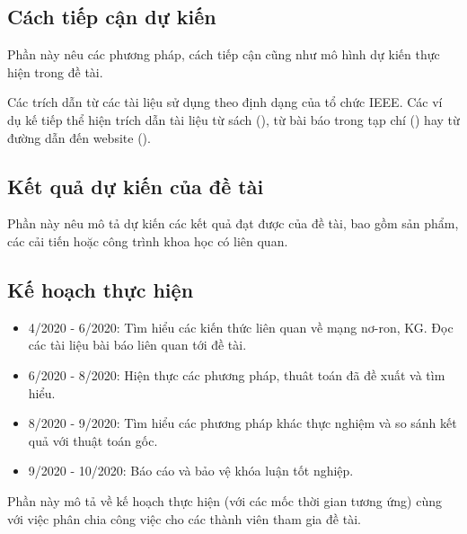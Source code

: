 \documentclass{article}[14pt]
\begin{document}
{    \subsection{Cách tiếp cận dự kiến}
    
    
    Phần này nêu các phương pháp, cách tiếp cận cũng như mô hình dự kiến thực hiện trong đề tài.
    
    Các trích dẫn từ các tài liệu sử dụng theo định dạng của tổ chức IEEE. Các ví dụ kế tiếp thể hiện trích dẫn tài liệu từ sách (\cite{latexcompanion}), từ bài báo trong tạp chí (\cite{einstein}) hay từ đường dẫn đến website (\cite{KGLP}).
    
    \subsection{Kết quả dự kiến của đề tài}
        
    Phần này nêu mô tả dự kiến các kết quả đạt được của đề tài, bao gồm sản phẩm, các cải tiến hoặc công trình khoa học có liên quan.
    
    \subsection{Kế hoạch thực hiện}
    \begin{itemize}
        \item 4/2020 - 6/2020: Tìm hiểu các kiến thức liên quan về mạng nơ-ron,  KG. Đọc các  tài liệu bài báo liên quan tới đề tài.
        \item 6/2020 - 8/2020: Hiện thực các phương pháp, thuât toán đã đề xuất và tìm hiểu.
        \item 8/2020 - 9/2020: Tìm hiểu các phương pháp khác thực nghiệm và so sánh kết quả với thuật toán gốc.
        \item 9/2020 - 10/2020: Báo cáo và bảo vệ khóa luận tốt nghiệp.
    \end{itemize}
    
    Phần này mô tả về kế hoạch thực hiện (với các mốc thời gian tương ứng) cùng với việc phân chia công việc cho các thành viên tham gia đề tài.
    
    
    }
    
    
    \nocite{*}
\end{document}

